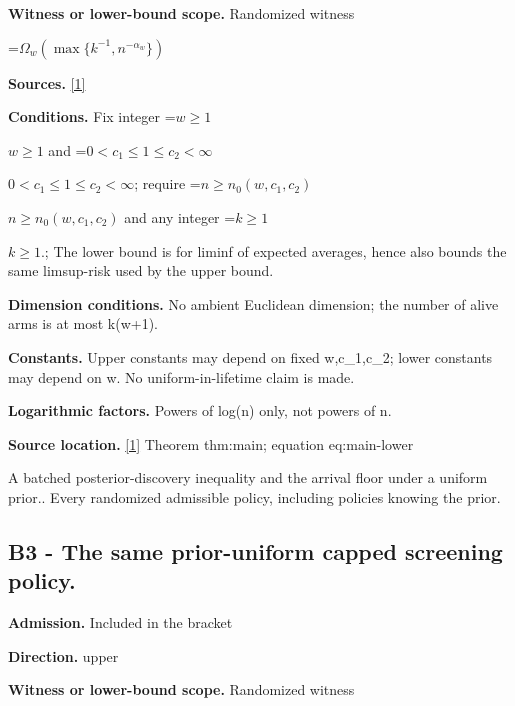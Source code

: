 \documentclass[10pt,a4paper]{article}
\newcommand{\AtlasMath}[1]{\par\begingroup\centering\setbox0=\hbox{$\displaystyle #1$}\ifdim\wd0>1.4\linewidth\typeout{ATLAS WIDE FORMULA: \the\wd0}\fi\ifdim\wd0>\linewidth\resizebox{\linewidth}{!}{\box0}\else\box0\fi\par\endgroup}
\newcommand{\AtlasInlineMath}[1]{\begingroup\setbox0=\hbox{$#1$}\ifdim\wd0>.4\linewidth\endgroup\AtlasMath{#1}\else\endgroup$#1$\fi}
\begin{document}
\textbf{Witness or lower-bound scope.} Randomized witness



\AtlasMath{\Omega_w(\max\{k^{-1},n^{-\alpha_w}\})}


\textbf{Sources.} \href{https://github.com/WU-Wendao/Colombo/blob/main/colombo_sensorium/Complexity_altas/data/sources/colombo/U09/manuscript.pdf}{[1]}



\textbf{Conditions.} Fix integer \AtlasInlineMath{w\ge1} and \AtlasInlineMath{0<c_1\le1\le c_2<\infty}; require \AtlasInlineMath{n\ge n_0(w,c_1,c_2)} and any integer \AtlasInlineMath{k\ge1}.; The lower bound is for liminf of expected averages, hence also bounds the same limsup-risk used by the upper bound.



\textbf{Dimension conditions.} No ambient Euclidean dimension; the number of alive arms is at most k(w+1).



\textbf{Constants.} Upper constants may depend on fixed w,c\_1,c\_2; lower constants may depend on w. No uniform-in-lifetime claim is made.



\textbf{Logarithmic factors.} Powers of log(n) only, not powers of n.



\textbf{Source location.} \href{https://github.com/WU-Wendao/Colombo/blob/main/colombo_sensorium/Complexity_altas/data/sources/colombo/U09/manuscript.pdf}{[1]} Theorem thm:main; equation eq:main-lower



A batched posterior-discovery inequality and the arrival floor under a uniform prior.. Every randomized admissible policy, including policies knowing the prior.



\subsection{B3 - The same prior-uniform capped screening policy.}


\textbf{Admission.} Included in the bracket



\textbf{Direction.} upper



\textbf{Witness or lower-bound scope.} Randomized witness
\end{document}
